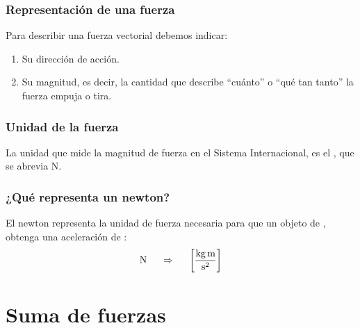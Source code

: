 \documentclass[14pt]{beamer}
\begin{document}
\begin{frame}
\frametitle{Representación de una fuerza}
Para describir una fuerza vectorial debemos indicar:
\begin{enumerate}[<+->]
\item Su dirección de acción.
\item Su magnitud, \pause es decir, la cantidad que describe \enquote{cuánto} o \enquote{qué tan tanto} la fuerza empuja o tira.
\end{enumerate}
\end{frame}
\begin{frame}
\frametitle{Unidad de la fuerza}
La unidad que mide la magnitud de fuerza en el Sistema Internacional, es el , que se abrevia \unit{\newton}.
\end{frame}
\begin{frame}
\frametitle{¿Qué representa un newton?}
El newton representa la unidad de fuerza necesaria para que un objeto de , obtenga una aceleración de :
\pause
\begin{align*}
\unit{\newton} \hspace{0.5cm} \Rightarrow \hspace{0.5cm} \left[ \unit[per-mode=fraction]{\kilo\gram\meter\per\square\second} \right]
\end{align*}
\end{frame}

\section{Suma de fuerzas}
\end{document}
